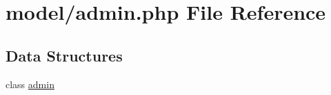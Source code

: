 \hypertarget{admin_8php}{}\section{model/admin.php File Reference}
\label{admin_8php}
\subsection*{Data Structures}
\begin{DoxyCompactItemize}
\item 
class \hyperlink{classadmin}{admin}
\end{DoxyCompactItemize}

